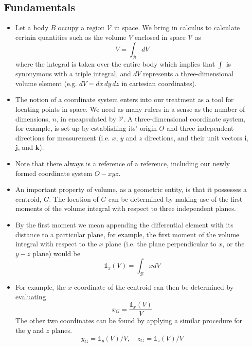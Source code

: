 \documentclass[11pt]{article}
\begin{document}
\subsection*{Fundamentals}
\label{sec:org586161c}
\begin{itemize}
\item Let a body \(B\) occupy a region \(\mathcal{V}\) in space. We bring in calculus to calculate certain quantities such as the volume \(V\) enclosed in space \(\mathcal{V}\) as
$$ V = \int_\mathcal{B} dV $$
where the integral is taken over the entire body which implies that \(\int\) is synonymous with a triple integral, and \(dV\) represents a three-dimensional volume element (e.g. \(dV=dx\,dy\,dz\) in cartesian coordinates).
\item The notion of a coordinate system enters into our treatment as a tool for locating points in space. We need as many rulers in a sense as the number of dimensions, \(n\),  in encapsulated by \(\mathcal{V}\). A three-dimensional coordinate system, for example, is set up by establishing its' origin \(O\) and three independent directions for measurement (i.e. \(x\), \(y\) and \(z\) directions, and their unit vectors \(\boldsymbol{i}\), \(\boldsymbol{j}\), and \(\boldsymbol{k}\)).
\item Note that there always is a reference of a reference, including our newly formed coordinate system \(O-xyz\).
\end{itemize}

\begin{itemize}
\item An important property of volume, as a geometric entity, is that it possesses a centroid, \(G\). The location of \(G\) can be determined by making use of the first moments of the volume integral with respect to three independent planes.
\item By the first moment we mean appending the differential element with its distance to a particular plane, for example, the first moment of the volume integral with respect to the \(x\) plane (i.e. the plane perpendicular to \(x\), or the \(y-z\) plane) would be
$$ \mathbb{1}_x(V) = \int_\mathcal{B} x dV $$
\item For example, the \(x\) coordinate of the centroid can then be determined by evaluating
$$ x_G = \frac{\mathbb{1}_x(V)}{V} $$
The other two coordinates can be found by applying a similar procedure for the \(y\) and \(z\) planes.
$$ y_G = \mathbb{1}_y(V)/V,\hspace{1em} z_G = \mathbb{1}_z(V)/V $$
\end{itemize}
\end{document}
